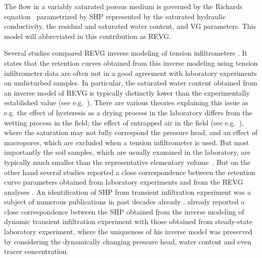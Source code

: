 \documentclass[review]{elsarticle}
\begin{document}
The flow in a variably saturated porous medium is governed by the Richards equation~\citep{richards} parametrized by SHP represented by the saturated hydraulic conductivity, the residual and saturated water content, and VG parameters. This model will abbreviated in this contribution as REVG.






 Several studies  compared REVG inverse modeling of tension infiltrometers  \citep{Verbist, Simunek1, Ventrella, Schwartz, Ramos, Simunek2, rezaei}. It states that the retention curves obtained from this inverse modeling using tension infiltrometer data are often not in a good agreement with laboratory experiments on undisturbed samples. In particular, the saturated water content obtained from an inverse model of REVG is typically distinctly lower than the experimentally established value (see e.g.~\citep{Simunek1, Verbist}). 
 There are various theories explaining this issue as e.g. the effect of hysteresis as a drying process in the laboratory differs from the wetting process in the field; the effect of entrapped air in the field (see e.g.~\citep{Fodor}), where the saturation may not fully correspond the pressure head, and an effect of macropores, which are excluded when a tension infiltrometer is used.  But most importantly the soil samples, which are usually  examined in the laboratory, are typically much smaller than the representative elementary volume~\citep{scharnagl}.
But on the other hand several studies  reported a close correspondence between the retention curve parameters obtained from laboratory experiments and from the REVG analyses \citep{Ramos, Schwartz}. 
An identification of SHP  from transient infiltration experiment was a subject of numerous publications in past decades already \citep{simunek-infiltr2shp, infiltr2shp, simunek2-infiltr2shp, XU201234, BAGARELLO201770,  hess-Younes-2017}.  \cite{simunek-infiltr2shp} already reported a close correspondence between the SHP  obtained from the inverse modeling of dynamic transient infiltration experiment with those obtained from steady-state laboratory experiment, where the uniqueness of his inverse model was preserved by considering the dynamically changing pressure head, water content and even tracer concentration.
\end{document}
